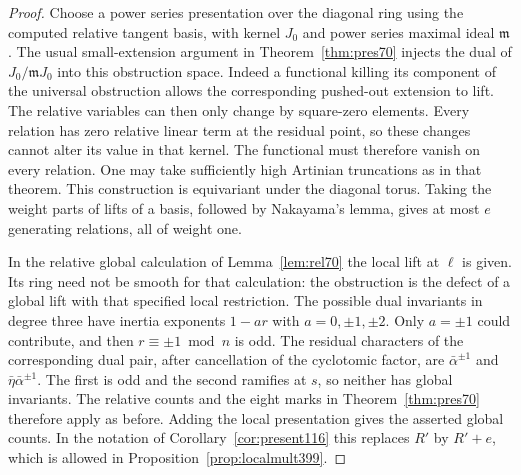 \documentclass[a4paper,11pt]{article}
\theoremstyle{definition}
\theoremstyle{remark}
\numberwithin{equation}{section}
\begin{document}
\begin{proof}
Choose a power series presentation over the diagonal ring
using the computed relative tangent basis, with kernel \(J_0\)
and power series maximal ideal \(\mathfrak m\). The usual
small-extension argument in Theorem~\ref{thm:pres70}
injects the dual of \(J_0/\mathfrak mJ_0\) into this obstruction
space. Indeed a functional killing its component of the
universal obstruction allows the corresponding pushed-out
extension to lift. The relative variables can then only change
by square-zero elements. Every relation has zero relative
linear term at the residual point, so these changes cannot
alter its value in that kernel. The functional must therefore
vanish on every relation. One may take sufficiently high
Artinian truncations as in that theorem. This construction
is equivariant under the diagonal torus. Taking the weight
parts of lifts of a basis, followed by Nakayama's lemma,
gives at most \(e\) generating relations, all of weight one.

In the relative global calculation of Lemma~\ref{lem:rel70}
the local lift at \(\ell\) is given. Its ring need not be
smooth for that calculation: the obstruction is the defect
of a global lift with that specified local restriction.
The possible dual invariants in degree three have inertia
exponents \(1-ar\) with \(a=0,\pm1,\pm2\). Only \(a=\pm1\)
could contribute, and then \(r\equiv\pm1\bmod n\) is odd.
The residual characters of the corresponding dual pair,
after cancellation of the cyclotomic factor, are
\(\bar\alpha^{\pm1}\) and \(\bar\eta\bar\alpha^{\pm1}\).
The first is odd and the second ramifies at \(s\), so neither
has global invariants. The relative counts and the eight
marks in Theorem~\ref{thm:pres70} therefore apply as before.
Adding the local presentation gives the asserted global counts.
In the notation of Corollary~\ref{cor:present116} this replaces
\(R'\) by \(R'+e\), which is allowed in
Proposition~\ref{prop:localmult399}.
\end{proof}
\end{document}
